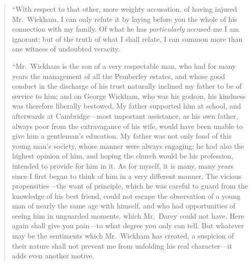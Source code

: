 \documentclass[12pt,english,oneside]{book}
\begin{document}
\begin{quotation}
{}``With respect to that other, more weighty accusation, of having
injured Mr.\ Wickham, I can only refute it by laying before you the
whole of his connection with my family. Of what he has \textit{particularly}
accused me I am ignorant; but of the truth of what I shall relate,
I can summon more than one witness of undoubted veracity.

{}``Mr.\ Wickham is the son of a very respectable man, who had for
many years the management of all the Pemberley estates, and whose
good conduct in the discharge of his trust naturally inclined my father
to be of service to him; and on George Wickham, who was his godson,
his kindness was therefore liberally bestowed. My father supported
him at school, and afterwards at Cambridge\mbox{---}most important
assistance, as his own father, always poor from the extravagance of
his wife, would have been unable to give him a gentleman's education.
My father was not only fond of this young man's society, whose manner
were always engaging; he had also the highest opinion of him, and
hoping the church would be his profession, intended to provide for
him in it. As for myself, it is many, many years since I first began
to think of him in a very different manner. The vicious propensities\mbox{---}the
want of principle, which he was careful to guard from the knowledge
of his best friend, could not escape the observation of a young man
of nearly the same age with himself, and who had opportunities of
seeing him in unguarded moments, which Mr.\ Darcy could not have.
Here again shall give you pain\mbox{---}to what degree you only can
tell. But whatever may be the sentiments which Mr.\ Wickham has created,
a suspicion of their nature shall not prevent me from unfolding his
real character\mbox{---}it adds even another motive.


\end{quotation}
\end{document}
